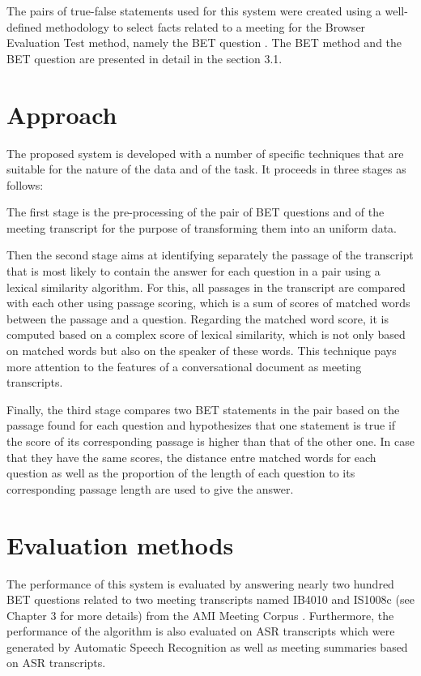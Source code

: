 The pairs of true-false statements used for this system were created using a well-defined methodology to select facts related to a meeting for the Browser Evaluation Test method, namely the BET question \cite{BET}. The BET method and the BET question are presented in detail  in the section 3.1.







\section{Approach  }
The proposed system is developed with a number of specific techniques that are suitable for the nature of the data and of the task. It proceeds in three stages as follows: 

The first stage is the pre-processing of the pair of BET questions and of the meeting transcript for the purpose of transforming them into an uniform data.

Then the second stage aims at identifying separately the passage of the transcript that is most likely to contain the answer for each question in a pair using a lexical similarity algorithm. For this, all passages in the transcript are compared with each other using passage scoring, which is a sum of scores of matched words between the passage and a question. Regarding the matched word score, it is computed based on a complex score of lexical similarity, which is not only based on matched words but also on the speaker of these words. This technique pays more attention to the features of a conversational document as meeting transcripts. 
 
Finally, the third stage compares two BET statements in the pair based on the passage found for each question and hypothesizes that one statement is true if the score of its corresponding passage is higher than that of the other one. In case that they have the same scores, the distance entre matched words for each question as well as the proportion of the length of each question to its corresponding passage length are used to give the answer. 


\section{Evaluation methods}
The performance of this system is evaluated by answering nearly two hundred BET questions related to two meeting transcripts named IB4010 and IS1008c (see Chapter 3 for more details) from the AMI Meeting Corpus \cite{AMI_corpus}. Furthermore, the performance of the algorithm is also evaluated on ASR transcripts which were generated by Automatic Speech Recognition \cite{ASR_transcrips} as well as meeting summaries based on ASR transcripts.
 
